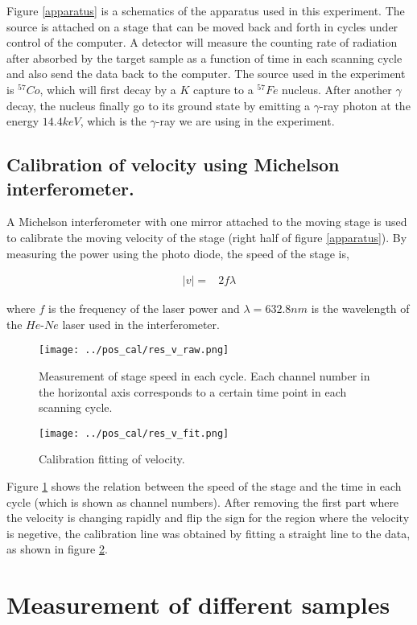 \documentclass[aps,twocolumn,secnumarabic,balancelastpage,amsmath,amssymb,nofootinbib]{revtex4}
\newcommand{\eqar}[1]
{
  \begin{align*}
    #1
  \end{align*}
}
\newcommand{\abs}[1]{{\left|{#1}\right|}}
\begin{document}
Figure \ref{apparatus} is a schematics of the apparatus used in this experiment. The source is attached on a stage that can be moved back and forth in cycles under control of the computer. A detector will measure the counting rate of radiation after absorbed by the target sample as a function of time in each scanning cycle and also send the data back to the computer. The source used in the experiment is ${}^{57}Co$, which will first decay by a $K$ capture to a ${}^{57}Fe$ nucleus. After another $\gamma$ decay, the nucleus finally go to its ground state by emitting a $\gamma$-ray photon at the energy $14.4keV$, which is the $\gamma$-ray we are using in the experiment.

\subsection{Calibration of velocity using Michelson interferometer.}
A Michelson interferometer with one mirror attached to the moving stage is used to calibrate the moving velocity of the stage (right half of figure \ref{apparatus}). By measuring the power using the photo diode, the speed of the stage is,
\eqar{
  \abs{v}=&2f\lambda
}
where $f$ is the frequency of the laser power and $\lambda=632.8nm$ is the wavelength of the $He$-$Ne$ laser used in the interferometer.
\begin{figure}
  \texttt{[image: ../pos\_cal/res\_v\_raw.png]}
  \caption{Measurement of stage speed in each cycle. Each channel number in the horizontal axis corresponds to a certain time point in each scanning cycle.}
  \label{v_raw}
\end{figure}
\begin{figure}
  \texttt{[image: ../pos\_cal/res\_v\_fit.png]}
  \caption{Calibration fitting of velocity.}
  \label{v_fit}
\end{figure}

Figure \ref{v_raw} shows the relation between the speed of the stage and the time in each cycle (which is shown as channel numbers). After removing the first part where the velocity is changing rapidly and flip the sign for the region where the velocity is negetive, the calibration line was obtained by fitting a straight line to the data, as shown in figure \ref{v_fit}.

\section{Measurement of different samples}
\end{document}
